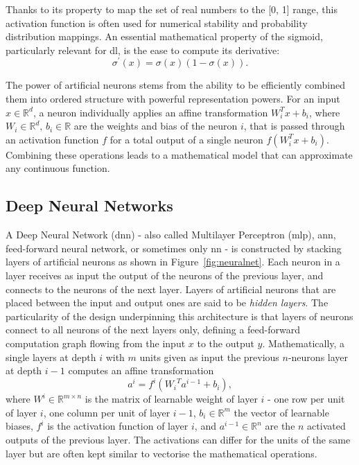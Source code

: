 Thanks to its property to map the set of real numbers to the [0, 1] range, this activation function is often used for numerical stability and probability distribution mappings. An essential mathematical property of the sigmoid, particularly relevant for \gls{dl}, is the ease to compute its derivative: \[\sigma^\prime(x) = \sigma(x) (1- \sigma(x)).\]

The power of artificial neurons stems from the ability to be efficiently combined them into ordered structure with powerful representation powers. For an input $x \in \mathbb{R}^d$, a neuron individually applies an affine transformation $W_i^T x + b_i$, where $W_i \in \mathbb{R}^d,\,b_i \in \mathbb{R}$ are the weights and bias of the neuron $i$, that is passed through an activation function $f$ for a total output of a single neuron $f(W_i^T x + b_i)$. Combining these operations leads to a mathematical model that can approximate any continuous function. 

\subsection{Deep Neural Networks}
A Deep Neural Network (\gls{dnn}) - also called Multilayer Perceptron (\gls{mlp}), \gls{ann}, feed-forward neural network, or sometimes only \gls{nn} - is constructed by stacking layers of artificial neurons as shown in Figure~\ref{fig:neuralnet}. Each neuron in a layer receives as input the output of the neurons of the previous layer, and connects to the neurons of the next layer. Layers of artificial neurons that are placed between the input and output ones are said to be \textit{hidden layers}. The particularity of the design underpinning this architecture is that layers of neurons connect to all neurons of the next layers only, defining a feed-forward computation graph flowing from the input $x$ to the output $y$. Mathematically, a single layers at depth $i$ with $m$ units given as input the previous $n$-neurons layer at depth $i-1$ computes an affine transformation
\begin{equation}\label{eq:feedforward}
    a^i = f^i\left({W_i}^T a^{i-1} + b_i\right),
\end{equation}
where $W^i \in \mathbb{R}^{m \times n}$ is the matrix of learnable weight of layer $i$ - one row per unit of layer $i$, one column per unit of layer $i-1$, $b_i \in \mathbb{R}^m$ the vector of learnable biases, $f^i$ is the activation function of layer $i$, and $a^{i-1} \in \mathbb{R}^n$ are the $n$ activated outputs of the previous layer. The activations can differ for the units of the same layer but are often kept similar to vectorise the mathematical operations. 

